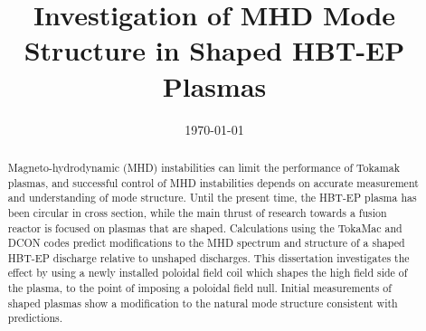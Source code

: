 \documentclass[aps,prl,twocolumn,superscriptaddress,groupedaddress]{revtex4}  %
\begin{document}
\widetext
{}


\title{Investigation of MHD Mode Structure in Shaped HBT-EP Plasmas}

\date{\today}


\begin{abstract}
Magneto-hydrodynamic (MHD) instabilities can limit the performance of Tokamak plasmas, and successful control of MHD instabilities depends on accurate measurement and understanding of mode structure.  Until the present time, the HBT-EP plasma has been circular in cross section, while the main thrust of research towards a fusion reactor is focused on plasmas that are shaped.  Calculations using the TokaMac and DCON codes predict modifications to the MHD spectrum and structure of a shaped HBT-EP discharge relative to unshaped discharges\cite{Maurer}.  This dissertation investigates the effect by using a newly installed poloidal field coil which shapes the high field side of the plasma, to the point of imposing a poloidal field null.  Initial measurements of shaped plasmas show a modification to the natural mode structure consistent with predictions.
\end{abstract}

\maketitle
\end{document}
